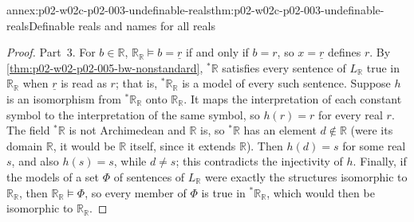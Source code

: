 \begin{annexitem}{annex:p02-w02c-p02-003-undefinable-reals}{thm:p02-w02c-p02-003-undefinable-reals}{Definable reals and names for all reals}
\begin{proof}
Part~3.  For \(b\in\mathbb R\), \(\mathbb R_{\mathbb R}\models b=\underline
r\) if and only if \(b=r\), so \(x=\underline r\) defines \(r\).  By
\cref{thm:p02-w02-p02-005-bw-nonstandard}, \({}^*\mathbb R\) satisfies
every sentence of \(L_{\mathbb R}\) true in \(\mathbb R_{\mathbb R}\) when
\(\underline r\) is read as \(r\); that is,
\({}^*\mathbb R_{\mathbb R}\) is a model of every such sentence.  Suppose
\(h\) is an isomorphism from \({}^*\mathbb R_{\mathbb R}\) onto
\(\mathbb R_{\mathbb R}\).  It maps the interpretation of each constant
symbol to the interpretation of the same symbol, so \(h(r)=r\) for every
real \(r\).  The field \({}^*\mathbb R\) is not Archimedean and
\(\mathbb R\) is, so \({}^*\mathbb R\) has an element \(d\notin\mathbb R\)
(were its domain \(\mathbb R\), it would be \(\mathbb R\) itself, since it
extends \(\mathbb R\)).  Then \(h(d)=s\) for some real \(s\), and also
\(h(s)=s\), while \(d\neq s\); this contradicts the injectivity of \(h\).
Finally, if the models of a set \(\Phi\) of sentences of \(L_{\mathbb R}\)
were exactly the structures isomorphic to \(\mathbb R_{\mathbb R}\), then
\(\mathbb R_{\mathbb R}\models\Phi\), so every member of \(\Phi\) is true
in \({}^*\mathbb R_{\mathbb R}\), which would then be isomorphic to
\(\mathbb R_{\mathbb R}\).
\end{proof}
\end{annexitem}

